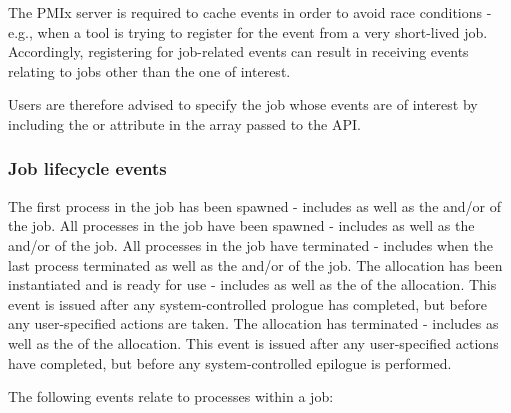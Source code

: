 {\adviceuserstart
The \ac{PMIx} server is required to cache events in order to avoid race
conditions - e.g., when a tool is trying to register for the
 event from a very short-lived job. Accordingly,
registering for job-related events can result in receiving events relating to
jobs other than the one of interest.

Users are therefore advised to specify the job whose events are of interest by
including the  or
 attribute in the  array passed
to the  \ac{API}.

\adviceuserend

\subsubsection{Job lifecycle events}

\begin{constantdesc}
%
The first process in the job has been spawned - includes  as well as the  and/or  of the job.
%
All processes in the job have been spawned - includes  as well as the  and/or  of the job.
%
All processes in the job have terminated - includes  when the last process terminated as well as the  and/or  of the job.
%
The allocation has been instantiated and is ready for use - includes  as well as the  of the allocation. This event is issued after any system-controlled prologue has completed, but before any user-specified actions are taken.
%
The allocation has terminated - includes  as well as the  of the allocation. This event is issued after any user-specified actions have completed, but before any system-controlled epilogue is performed.
%
\end{constantdesc}

The following events relate to processes within a job:

}
